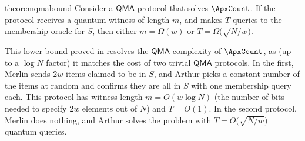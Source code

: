 \begin{restatable}{theorem}{qmabound}
\label{thm:qmabound}
Consider a $\mathsf{QMA}$ protocol that solves $\ApxCount$. If the protocol receives a quantum witness of length $m$, and makes $T$ queries to the membership oracle for $S$, then
either $m = \Omega(w)$ or 
$ T = \Omega\bigl(\sqrt{N/w}\bigr)$.
\end{restatable}

This lower bound proved in  resolves the $\mathsf{QMA}$ complexity of  $\ApxCount$, as (up to a $\log N$ factor) it matches the cost of two trivial $\mathsf{QMA}$ protocols.
In the first, Merlin sends $2w$ items claimed to be in $S$,
and Arthur picks a constant number of the items at random
and confirms they are all in $S$ with one membership query each. 
This protocol has witness length $m=O(w\log N)$ (the number of bits needed to specify $2w$ elements out of $N$) and $T=O(1)$. 
In the second protocol, Merlin does nothing, and Arthur solves the problem with $T=O\bigl(\sqrt{N/w}\bigr)$ quantum queries.
